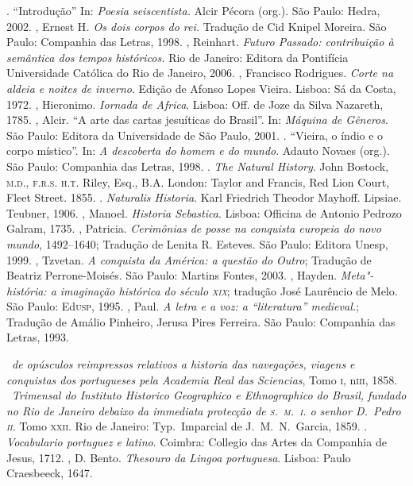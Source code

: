 \begin{bibliohedra}
\titidem. ``Introdução'' In: \textit{Poesia seiscentista.} Alcir Pécora (org.). São Paulo:
Hedra, 2002.
, Ernest H\textit{. Os dois corpos do rei.} Tradução de Cid
Knipel Moreira. São Paulo: Companhia das Letras, 1998.
, Reinhart. \textit{Futuro Passado: contribuição à
semântica dos tempos históricos.}  Rio de Janeiro: Editora da
Pontifícia Universidade Católica do Rio de Janeiro, 2006.
, Francisco Rodrigues. \textit{Corte na aldeia e noites de inverno}.
Edição de Afonso Lopes Vieira. Lisboa: Sá da
Costa, 1972.
, Hieronimo. \textit{Iornada de Africa}.
Lisboa: Off. de Joze da Silva Nazareth, 1785.
, Alcir. ``A arte das cartas jesuíticas do Brasil''. In: \textit{Máquina de
Gêneros}. São Paulo: Editora da Universidade de São Paulo, 2001. 
\titidem. ``Vieira, o índio e o corpo místico''. In: \textit{A
descoberta do homem e do mundo}. Adauto Novaes (org.). São Paulo:
Companhia das Letras, 1998.
. \textit{The Natural History}. John Bostock, \textsc{m.d., f.r.s.
h.t.} Riley, Esq., B.A. London: Taylor and Francis, Red Lion Court,
Fleet Street. 1855.
\titidem. \textit{Naturalis Historia}. Karl Friedrich Theodor
Mayhoff. Lipsiae. Teubner, 1906.
, Manoel. \textit{Historia Sebastica}. Lisboa: Officina de Antonio Pedrozo Galram, 1735. 
, Patricia. \textit{Cerimônias de posse na conquista europeia do novo mundo}, 1492--1640; 
Tradução de Lenita R. Esteves. São Paulo: Editora
Unesp, 1999.
, Tzvetan. \textit{A conquista da América: a questão do Outro}; Tradução de 
Beatriz Perrone-Moisés. São Paulo: Martins Fontes, 2003.
, Hayden. \textit{Meta"-história: a imaginação histórica do século \textsc{xix}};
tradução José Laurêncio de Melo. São Paulo: Ed\textsc{usp}, 1995.
, Paul. \textit{A letra e a voz: a ``literatura'' medieval.}; Tradução de Amálio
Pinheiro, Jerusa Pires Ferreira. São Paulo: Companhia das Letras, 1993.

\medskip
{}

\ \textit{de opúsculos reimpressos relativos a historia
das navegações, viagens e conquistas dos portugueses pela Academia Real
das Sciencias}, Tomo \textsc{i}, n\oi \textsc{iii}, 1858.
\ \textit{Trimensal do Instituto Historico Geographico e
Ethnographico do Brasil, fundado no Rio de Janeiro debaixo da immediata
protecção de \textsc{s.~m.~i.} o senhor D.~Pedro \textsc{ii}}. Tomo \textsc{xxii}. Rio de Janeiro:
Typ.~Imparcial de J.~M.~N.~Garcia, 1859.
. \textit{Vocabulario portuguez e latino}. Coimbra: Collegio das Artes da Companhia de
Jesus, 1712. \enlargethispage{\baselineskip}
, D. Bento. \textit{Thesouro da Lingoa portuguesa}. Lisboa: Paulo Craesbeeck, 1647.
\end{bibliohedra}
